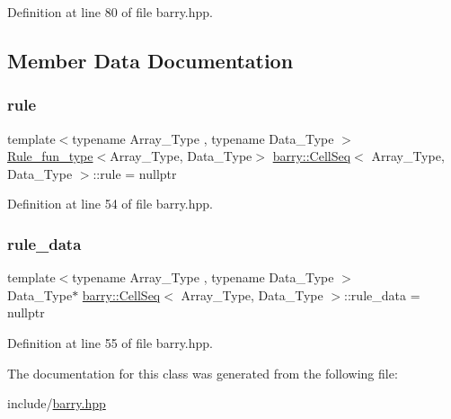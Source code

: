Definition at line 80 of file barry.\+hpp.



\subsection{Member Data Documentation}
\mbox{\label{classbarry_1_1_cell_seq_a57dfbe0d6e42b3828cb8d0ba8ddc8640}} 
\subsubsection{\texorpdfstring{rule}{rule}}
{\footnotesize\ttfamily template$<$typename Array\+\_\+\+Type , typename Data\+\_\+\+Type $>$ \\
\hyperlink{namespacebarry_aefd7e6d4ba228e2ce1074d075c512178}{Rule\+\_\+fun\+\_\+type}$<$Array\+\_\+\+Type, Data\+\_\+\+Type$>$ \hyperlink{classbarry_1_1_cell_seq}{barry\+::\+Cell\+Seq}$<$ Array\+\_\+\+Type, Data\+\_\+\+Type $>$\+::rule = nullptr\hspace{0.3cm}{\ttfamily [protected]}}



Definition at line 54 of file barry.\+hpp.

\mbox{\label{classbarry_1_1_cell_seq_ad8d6cd5a38746d02d98f4fc8b7624863}} 
\subsubsection{\texorpdfstring{rule\+\_\+data}{rule\_data}}
{\footnotesize\ttfamily template$<$typename Array\+\_\+\+Type , typename Data\+\_\+\+Type $>$ \\
Data\+\_\+\+Type$\ast$ \hyperlink{classbarry_1_1_cell_seq}{barry\+::\+Cell\+Seq}$<$ Array\+\_\+\+Type, Data\+\_\+\+Type $>$\+::rule\+\_\+data = nullptr\hspace{0.3cm}{\ttfamily [protected]}}



Definition at line 55 of file barry.\+hpp.



The documentation for this class was generated from the following file\+:\begin{DoxyCompactItemize}
\item 
include/\hyperlink{barry_8hpp}{barry.\+hpp}\end{DoxyCompactItemize}
